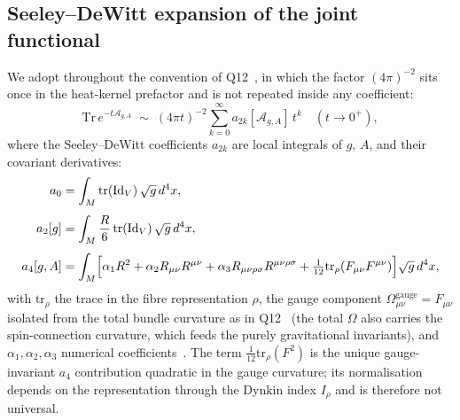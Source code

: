 \documentclass[12pt,a4paper]{article}
\theoremstyle{remark}
\begin{document}
    \subsection{Seeley--DeWitt expansion of the joint functional}
      \label{ssec:SDW}

      We adopt throughout the convention of Q12~\cite{Beau2026q12}, in which the factor
      $(4\pi)^{-2}$ sits once in the heat-kernel prefactor and is not repeated inside any
      coefficient:
      \begin{equation}
        \mathrm{Tr}\,e^{-t\mathcal{A}_{g,A}}
        \;\sim\;
        (4\pi t)^{-2}\sum_{k=0}^\infty a_{2k}[\mathcal{A}_{g,A}]\,t^{k}
        \quad (t\to 0^+),
        \label{eq:heat-kernel}
      \end{equation}
      where the Seeley--DeWitt coefficients $a_{2k}$ are local integrals of
      $g$, $A$, and their covariant derivatives:
      \begin{align}
        a_0 &= \int_M \mathrm{tr}(\mathrm{Id}_V)\,\sqrt{g}\,d^4x,
        \label{eq:a0}
        \\[4pt]
        a_2[g]
        &= \int_M \frac{R}{6}\,\mathrm{tr}(\mathrm{Id}_V)\,\sqrt{g}\,d^4x,
        \label{eq:a2}
        \\[4pt]
        a_4[g,A]
        &= \int_M
        \Bigl[
          \alpha_1 R^2 + \alpha_2 R_{\mu\nu}R^{\mu\nu}
          + \alpha_3 R_{\mu\nu\rho\sigma}R^{\mu\nu\rho\sigma}
          + \tfrac{1}{12}\mathrm{tr}_\rho(F_{\mu\nu}F^{\mu\nu})
          \Bigr]\sqrt{g}\,d^4x,
        \label{eq:a4}
      \end{align}
      with $\mathrm{tr}_\rho$ the trace in the fibre representation $\rho$, the gauge component
      $\Omega^{\mathrm{gauge}}_{\mu\nu} = F_{\mu\nu}$ isolated from the total bundle curvature as
      in Q12~\cite{Beau2026q12} (the total $\Omega$ also carries the spin-connection curvature,
      which feeds the purely gravitational invariants), and $\alpha_1,\alpha_2,\alpha_3$
      numerical coefficients~\cite{Vassilevich2003}.
      The term $\tfrac{1}{12}\mathrm{tr}_\rho(F^2)$ is the unique gauge-invariant $a_4$
      contribution quadratic in the gauge curvature; its normalisation depends on the
      representation through the Dynkin index $I_\rho$ and is therefore not universal.
\end{document}
